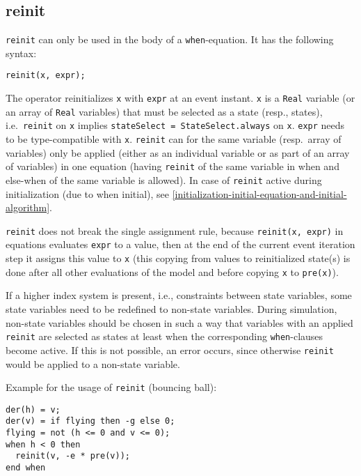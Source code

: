\subsection{reinit}\label{reinit}

\lstinline!reinit! can only be used in the body of a \lstinline!when!-equation.
It has the following syntax:
\begin{lstlisting}[language=modelica]
reinit(x, expr);
\end{lstlisting}

The operator reinitializes \lstinline!x! with \lstinline!expr! at an event instant.  \lstinline!x! is a \lstinline!Real! variable (or an array of \lstinline!Real! variables) that must be selected as a state (resp., states), i.e.\ \lstinline!reinit! on \lstinline!x! implies \lstinline!stateSelect = StateSelect.always! on \lstinline!x!.  \lstinline!expr! needs to be type-compatible with \lstinline!x!.  \lstinline!reinit! can for the same variable (resp.\ array of variables) only be applied (either as an individual variable or as part of an array of variables) in one equation (having \lstinline!reinit! of the same variable in when and else-when of the same variable is allowed).  In case of \lstinline!reinit! active during initialization (due to when initial), see \cref{initialization-initial-equation-and-initial-algorithm}.

\lstinline!reinit! does not break the single assignment rule, because \lstinline!reinit(x, expr)! in equations evaluates \lstinline!expr! to a value,
then at the end of the current event iteration step it assigns this value to \lstinline!x! (this copying from values to reinitialized state(s) is
done after all other evaluations of the model and before copying \lstinline!x! to \lstinline!pre(x)!).

\begin{example}
If a higher index system is present, i.e., constraints between
state variables, some state variables need to be redefined to non-state
variables. During simulation, non-state variables should be chosen in
such a way that variables with an applied \lstinline!reinit! are
selected as states at least when the corresponding \lstinline!when!-clauses become
active. If this is not possible, an error occurs, since otherwise
\lstinline!reinit! would be applied to a non-state variable.

Example for the usage of \lstinline!reinit! (bouncing ball):
\begin{lstlisting}[language=modelica]
der(h) = v;
der(v) = if flying then -g else 0;
flying = not (h <= 0 and v <= 0);
when h < 0 then
  reinit(v, -e * pre(v));
end when
\end{lstlisting}
\end{example}

